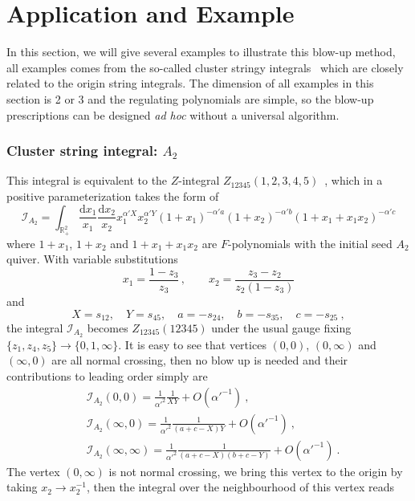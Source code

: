 \documentclass[12pt]{article}
\theoremstyle{definition}
\theoremstyle{plain}
\newcommand{\dif}{\mathrm{d}} %
\begin{document}
\section{Application and Example}

In this section, we will give several examples to illustrate this blow-up method, all examples comes from the so-called cluster stringy integrals~\cite{Arkani-Hamed:2019mrd} which are closely related to the origin string integrals. The dimension of all examples in this section is 2 or 3 and the regulating polynomials are simple, so the blow-up prescriptions can be designed \emph{ad hoc} without a universal algorithm.


\subsubsection*{Cluster string integral: $A_{2}$}
This integral is equivalent to the $Z$-integral $Z_{12345}(1,2,3,4,5)$~\cite{Mafra:2016mcc}, which in a positive parameterization takes the form of 
\[
	\mathcal{I}_{A_{2}}=\int_{\mathbb R_+^2} \frac{\dif x_1}{x_1}\frac{\dif x_2}{x_2}x_1^{\alpha' X}x_2^{\alpha' Y}
	(1+x_1)^{-\alpha' a}(1+x_2)^{-\alpha' b}(1+x_1+x_1x_2)^{-\alpha' c}
\] 
where $1+x_{1}$, $1+x_{2}$ and $1+x_{1}+x_{1}x_{2}$ are $F$-polynomials with the initial seed $A_{2}$ quiver. With variable substitutions
\[
	x_{1}=\frac{1-z_{3}}{z_{3}}\,,\qquad x_{2}=\frac{z_{3}-z_{2}}{z_{2}(1-z_{3})}
\]
and 
\[
	X=s_{12},\quad Y=s_{45},\quad a=-s_{24},\quad b=-s_{35},\quad c=-s_{25} \:,
	\] 
the integral $\mathcal{I}_{A_{2}}$ becomes $Z_{12345}(12345)$ under the usual gauge fixing $\{z_{1},z_{4},z_{5}\}\to\{0,1,\infty\}$. It is easy to see that vertices $(0,0)$, $(0,\infty)$ and $(\infty,0)$ are all normal crossing, then no blow up is needed and their contributions to leading order simply are
\begin{align*}
	&\mathcal{I}_{A_{2}}(0,0)=\frac{1}{\alpha'^{2}}\frac{1}{XY}+O(\alpha'^{-1}) \:, \\
	&\mathcal{I}_{A_{2}}(\infty,0)=\frac{1}{\alpha'^{2}}\frac{1}{(a+c-X)Y}+O(\alpha'^{-1}) \:, \\
	&\mathcal{I}_{A_{2}}(\infty,\infty)=\frac{1}{\alpha'^{2}}\frac{1}{(a+c-X)(b+c-Y)}+O(\alpha'^{-1}) \:.
\end{align*}
The vertex $(0,\infty)$ is not normal crossing, we bring this vertex to the origin by taking $x_{2}\to x_{2}^{-1}$, then the integral over the neighbourhood of this vertex reads
\end{document}
